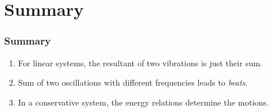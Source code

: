 \documentclass[pdf,hideothersubsections]{beamer}
\begin{document}




\section{Summary}
\begin{frame}
\frametitle{Summary}
\begin{enumerate}
\pause
\item For linear systems, the resultant of two vibrations is just their sum.
\pause
\item Sum of two oscillations with different frequencies leads to \emph{beats}.
\pause
\item In a conservative system, the energy relations determine the
  motions.
\end{enumerate}
\end{frame}
\end{document}

